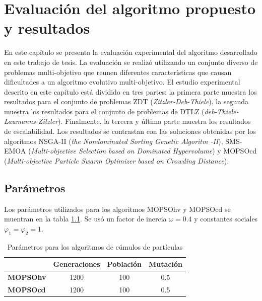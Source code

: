 
\chapter{Evaluaci\'on del algoritmo propuesto y resultados}

En este cap\'itulo se presenta la evaluaci\'on experimental del algoritmo desarrollado en este trabajo de tesis. 
La evaluaci\'on se realiz\'o utilizando un conjunto diverso de problemas multi-objetivo que reunen diferentes caracter\'isticas que causan 
dificultades a un algoritmo evolutivo multi-objetivo. El estudio experimental descrito en este cap\'itulo est\'a dividido 
en tres partes: la primera parte muestra los resultados para el conjunto de problemas ZDT (\textit{Zitzler-Deb-Thiele}), 
la segunda muestra los resultados para el conjunto de problemas de DTLZ (\textit{deb-Thiele-Laumanns-Zitzler}). 
Finalmente, la tercera y \'ultima parte muestra los resultados de escalabilidad. Los resultados se contrastan 
con las soluciones obtenidas por los algoritmos NSGA-II (\textit{the Nondominated Sorting Genetic Algoritm -II}), SMS-EMOA 
(\textit{Multi-objective Selection based on Dominated Hypervolume}) y MOPSOcd (\textit{Multi-objective Particle Swarm Optimizer based on 
Crowding Distance}).

  \section*{Par\'ametros}

  Los par\'ametros utilizados para \DIFaddbegin {}\DIFaddend los algoritmos MOPSOhv y MOPSOcd se muentran en la tabla
  \ref{tab:parametros1}. Se us\'o un factor de 
  inercia $\omega = 0.4$ y constantes sociales $\varphi_{1}=\varphi_{2}=1$.

 \begin{table}[H]
  \begin{center}
    \begin{tabular}{|l||c|c|c|}
	\hline
	& \textbf{Generaciones}  & \textbf{Poblaci\'on} & \textbf{Mutaci\'on} \\
	\hline
	\hline
	\textbf{MOPSOhv} & 1200 & 100 &0.5\\ 
	\hline
	\textbf{MOPSOcd} & 1200 & 100 &0.5\\
	\hline
	\end{tabular}
	\caption{Par\'ametros para los algoritmos de c\'umulos de part\'iculas}
  \label{tab:parametros1}
  \end{center}
\end{table}

